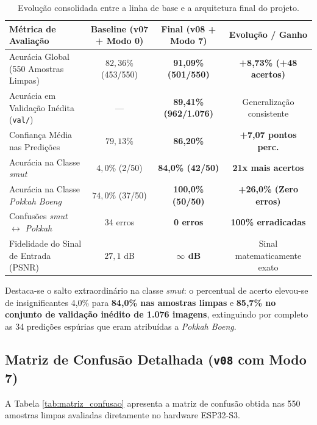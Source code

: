 \begin{table}[H]
\centering
\caption{Evolução consolidada entre a linha de base e a arquitetura final do projeto.}
\label{tab:comparativo_v07_v08}
\begin{tabular}{lccc}
\toprule
\textbf{Métrica de Avaliação} & \textbf{Baseline (v07 + Modo 0)} & \textbf{Final (v08 + Modo 7)} & \textbf{Evolução / Ganho} \\
\midrule
Acurácia Global (550 Amostras Limpas) & $82,36\%$ (453/550) & \textbf{91,09\% (501/550)} & \textbf{+8,73\% (+48 acertos)} \\
Acurácia em Validação Inédita (\texttt{val/}) & --- & \textbf{89,41\% (962/1.076)} & Generalização consistente \\
Confiança Média nas Predições         & $79,13\%$ & \textbf{86,20\%} & \textbf{+7,07 pontos perc.} \\
Acurácia na Classe \textit{smut}      & $4,0\%$ (2/50) & \textbf{84,0\% (42/50)} & \textbf{21x mais acertos} \\
Acurácia na Classe \textit{Pokkah Boeng} & $74,0\%$ (37/50) & \textbf{100,0\% (50/50)} & \textbf{+26,0\% (Zero erros)} \\
Confusões \textit{smut} $\leftrightarrow$ \textit{Pokkah} & 34 erros & \textbf{0 erros} & \textbf{100\% erradicadas} \\
Fidelidade do Sinal de Entrada (PSNR) & $27,1$ dB & \textbf{$\infty$ dB} & Sinal matematicamente exato \\
\bottomrule
\end{tabular}
\end{table}

Destaca-se o salto extraordinário na classe \textit{smut}: o percentual de acerto elevou-se de insignificantes 4,0\% para \textbf{84,0\% nas amostras limpas} e \textbf{85,7\% no conjunto de validação inédito de 1.076 imagens}, extinguindo por completo as 34 predições espúrias que eram atribuídas a \textit{Pokkah Boeng}.

\subsection{Matriz de Confusão Detalhada (\texttt{v08} com Modo 7)}

A Tabela \ref{tab:matriz_confusao} apresenta a matriz de confusão obtida nas 550 amostras limpas avaliadas diretamente no hardware ESP32-S3.

